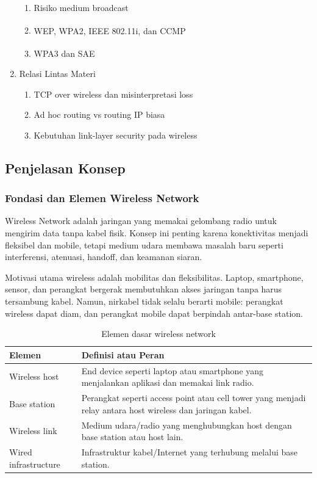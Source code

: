 \begin{enumerate}
    \begin{enumerate}
        \item \pwajib Risiko medium broadcast
        \item \pwajib WEP, WPA2, IEEE 802.11i, dan CCMP\textsuperscript{\ddag}
        \item \ppaham WPA3 dan SAE\textsuperscript{\dag}
    \end{enumerate}
    \item \pwajib Relasi Lintas Materi
    \begin{enumerate}
        \item \pwajib TCP over wireless dan misinterpretasi loss
        \item \pwajib Ad hoc routing vs routing IP biasa
        \item \pwajib Kebutuhan link-layer security pada wireless
    \end{enumerate}
\end{enumerate}

\subsection{Penjelasan Konsep}

\subsubsection{Fondasi dan Elemen Wireless Network}
\begin{jawab}
Wireless Network adalah jaringan yang memakai gelombang radio untuk mengirim data tanpa kabel fisik. Konsep ini penting karena konektivitas menjadi fleksibel dan mobile, tetapi medium udara membawa masalah baru seperti interferensi, atenuasi, handoff, dan keamanan siaran.
\end{jawab}

Motivasi utama wireless adalah mobilitas dan fleksibilitas. Laptop, smartphone, sensor, dan perangkat bergerak membutuhkan akses jaringan tanpa harus tersambung kabel. Namun, nirkabel tidak selalu berarti mobile: perangkat wireless dapat diam, dan perangkat mobile dapat berpindah antar-base station.

\begin{table}[H]
\centering
\begin{tabularx}{\textwidth}{|L{0.28\textwidth}|X|}
\hline
\textbf{Elemen} & \textbf{Definisi atau Peran} \\
\hline
Wireless host & End device seperti laptop atau smartphone yang menjalankan aplikasi dan memakai link radio. \\
\hline
Base station & Perangkat seperti access point atau cell tower yang menjadi relay antara host wireless dan jaringan kabel. \\
\hline
Wireless link & Medium udara/radio yang menghubungkan host dengan base station atau host lain. \\
\hline
Wired infrastructure & Infrastruktur kabel/Internet yang terhubung melalui base station. \\
\hline
\end{tabularx}
\caption{Elemen dasar wireless network}
\label{tab:wireless-elements}
\end{table}

